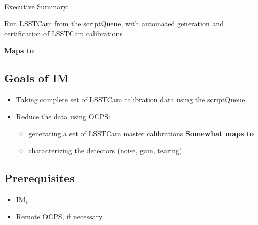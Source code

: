 
Executive Summary:

Run LSSTCam from the scriptQueue, with automated generation and certification of LSSTCam calibrations

\textbf{Maps to }

\subsection{Goals of IM}
\begin{itemize}
\item Taking complete set of LSSTCam calibration data using the scriptQueue
\item Reduce the data using \gls{OCPS}:
  \begin{itemize}
  \item generating a set of LSSTCam master calibrations
      \textbf{Somewhat maps to }
  \item characterizing the detectors (noise, gain, tearing)
  \end{itemize}
\end{itemize}
\subsection{Prerequisites}

\begin{itemize}
\item{IM\(_{\text{b}}\)}
\item{Remote \gls{OCPS}, if necessary}
\end{itemize}

